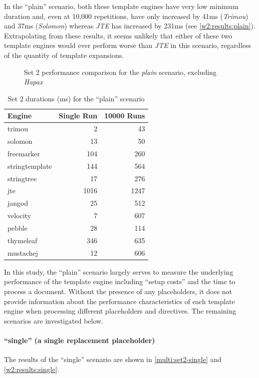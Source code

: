 In the \enquote{plain} scenario, both these \gls{template engine}s have very low minimum duration and, even at 10,000 repetitions, have only increased by 41ms (\emph{Trimou}) and 37ms (\emph{Solomon}) whereas \emph{JTE} has increased by 231ms (see \autoref{w2:results:plain}). Extrapolating from these results, it seems unlikely that either of these two \gls{template engine}s would ever perform worse than \emph{JTE} in this scenario, regardless of the quantity of template expansions.

\begin{figure}[!p]
\centering

\caption{\label{multi:set2-plain}Set 2 performance comparison for the \emph{plain} scenario, excluding \emph{Hapax}}
\end{figure}

\begin{table}[!p]
\centering
\begin{tabular}{lrr}
\textbf{Engine} & \textbf{Single Run} & \textbf{10000 Runs} \\
\hline
trimou & 2 & 43 \\
solomon & 13 & 50 \\
freemarker & 104 & 260 \\
stringtemplate & 144 & 564 \\
stringtree & 17 & 276 \\
jte & 1016 & 1247 \\
jangod & 25 & 512\\
velocity & 7 & 607\\
pebble & 28 & 114 \\
thymeleaf & 346 & 635 \\
mustachej & 12 & 606 \\
\end{tabular}
\caption{Set 2 durations (ms) for the \enquote{plain} scenario\label{w2:results:plain}}
\end{table}

In this study, the \enquote{plain} scenario largely serves to measure the underlying performance of the \gls{template engine} including \enquote{setup costs} and the time to process a document. Without the presence of any placeholders, it does not provide information about the performance characteristics of each \gls{template engine} when processing different placeholders and directives. The remaining scenarios are investigated below.

\paragraph{\enquote{single} (a single replacement placeholder)}
\label{A151}
The results of the \enquote{single} scenario are shown in \autoref{multi:set2-single} and \autoref{w2:results:single}.

